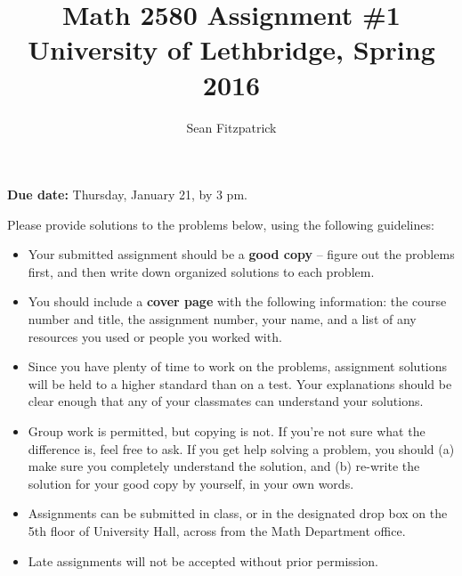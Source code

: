 \documentclass[letterpaper,12pt]{article}
\title{Math 2580 Assignment \#1\\University of Lethbridge, Spring 2016}
\author{Sean Fitzpatrick}
\begin{document}
 \maketitle

{\bf Due date:} Thursday, January 21, by 3 pm.

\bigskip

Please provide solutions to the problems below, using the following guidelines:
\begin{itemize}
\item Your submitted assignment should be a {\bf good copy} -- figure out the problems first, and then write down organized solutions to each problem. 
\item You should include a {\bf cover page} with the following information: the course number and title, the assignment number, your name, and a list of any resources you used or people you worked with.
\item Since you have plenty of time to work on the problems, assignment solutions will be held to a higher standard than on a test. Your explanations should be clear enough that any of your classmates can understand your solutions.
\item Group work is permitted, but copying is not. If you're not sure what the difference is, feel free to ask. If you get help solving a problem, you should (a) make sure you completely understand the solution, and (b) re-write the solution for your good copy by yourself, in your own words.
\item Assignments can be submitted in class, or in the designated drop box on the 5th floor of University Hall, across from the Math Department office.
\item Late assignments will not be accepted without prior permission.

\end{itemize}
\newpage
\end{document}
